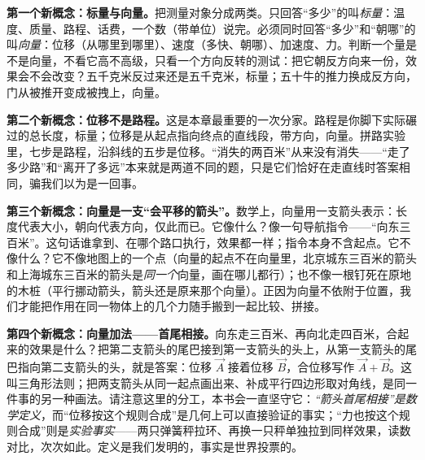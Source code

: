 
\begin{mainline}
\textbf{第一个新概念：标量与向量。}把测量对象分成两类。只回答“多少”的叫\emph{标量}：温度、质量、路程、话费，一个数（带单位）说完。必须同时回答“多少”和“朝哪”的叫\emph{向量}：位移（从哪里到哪里）、速度（多快、朝哪）、加速度、力。判断一个量是不是向量，不看它高不高级，只看一个方向反转的测试：把它朝反方向来一份，效果会不会改变？五千克米反过来还是五千克米，标量；五十牛的推力换成反方向，门从被推开变成被拽上，向量。

\textbf{第二个新概念：位移不是路程。}这是本章最重要的一次分家。路程是你脚下实际碾过的总长度，标量；位移是从起点指向终点的直线段，带方向，向量。拼路实验里，七步是路程，沿斜线的五步是位移。“消失的两百米”从来没有消失——“走了多少路”和“离开了多远”本来就是两道不同的题，只是它们恰好在走直线时答案相同，骗我们以为是一回事。

\textbf{第三个新概念：向量是一支“会平移的箭头”。}数学上，向量用一支箭头表示：长度代表大小，朝向代表方向，仅此而已。它像什么？像一句导航指令——“向东三百米”。这句话谁拿到、在哪个路口执行，效果都一样；指令本身不含起点。它不像什么？它不像地图上的一个点（向量的起点不在向量里，北京城东三百米的箭头和上海城东三百米的箭头是\emph{同一个}向量，画在哪儿都行）；也不像一根钉死在原地的木桩（平行挪动箭头，箭头还是原来那个向量）。正因为向量不依附于位置，我们才能把作用在同一物体上的几个力随手搬到一起比较、拼接。

\textbf{第四个新概念：向量加法——首尾相接。}向东走三百米、再向北走四百米，合起来的效果是什么？把第二支箭头的尾巴接到第一支箭头的头上，从第一支箭头的尾巴指向第二支箭头的头，就是答案：位移 \(\vec{A}\) 接着位移 \(\vec{B}\)，合位移写作 \(\vec{A}+\vec{B}\)。这叫三角形法则；把两支箭头从同一起点画出来、补成平行四边形取对角线，是同一件事的另一种画法。请注意这里的分工，本书会一直坚守它：\emph{“箭头首尾相接”是数学定义}，而“位移按这个规则合成”是几何上可以直接验证的事实；“力也按这个规则合成”则是\emph{实验事实}——两只弹簧秤拉环、再换一只秤单独拉到同样效果，读数对比，次次如此。定义是我们发明的，事实是世界投票的。
\end{mainline}

\begin{center}
\end{center}

